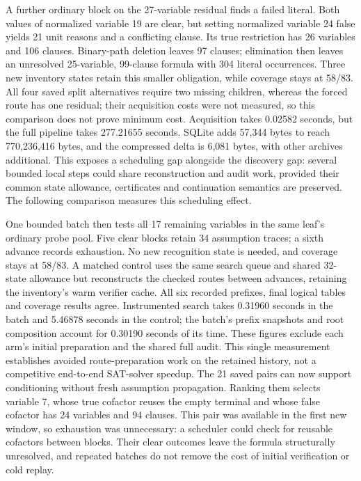 \documentclass[11pt,a4paper]{article}
\numberwithin{equation}{section}
\theoremstyle{plain}
\theoremstyle{definition}
\theoremstyle{remark}
\begin{document}
A further ordinary block on the 27-variable residual finds a failed literal. Both values of normalized variable 19 are clear, but setting normalized variable 24 false yields 21 unit reasons and a conflicting clause. Its true restriction has 26 variables and 106 clauses. Binary-path deletion leaves 97 clauses; elimination then leaves an unresolved 25-variable, 99-clause formula with 304 literal occurrences. Three new inventory states retain this smaller obligation, while coverage stays at 58/83. All four saved split alternatives require two missing children, whereas the forced route has one residual; their acquisition costs were not measured, so this comparison does not prove minimum cost. Acquisition takes 0.02582 seconds, but the full pipeline takes 277.21655 seconds. SQLite adds 57,344 bytes to reach 770,236,416 bytes, and the compressed delta is 6,081 bytes, with other archives additional. This exposes a scheduling gap alongside the discovery gap: several bounded local steps could share reconstruction and audit work, provided their common state allowance, certificates and continuation semantics are preserved. The following comparison measures this scheduling effect.

One bounded batch then tests all 17 remaining variables in the same leaf's ordinary probe pool. Five clear blocks retain 34 assumption traces; a sixth advance records exhaustion. No new recognition state is needed, and coverage stays at 58/83. A matched control uses the same search queue and shared 32-state allowance but reconstructs the checked routes between advances, retaining the inventory's warm verifier cache. All six recorded prefixes, final logical tables and coverage results agree. Instrumented search takes 0.31960 seconds in the batch and 5.46878 seconds in the control; the batch's prefix snapshots and root composition account for 0.30190 seconds of its time. These figures exclude each arm's initial preparation and the shared full audit. This single measurement establishes avoided route-preparation work on the retained history, not a competitive end-to-end SAT-solver speedup. The 21 saved pairs can now support conditioning without fresh assumption propagation. Ranking them selects variable 7, whose true cofactor reuses the empty terminal and whose false cofactor has 24 variables and 94 clauses. This pair was available in the first new window, so exhaustion was unnecessary: a scheduler could check for reusable cofactors between blocks. Their clear outcomes leave the formula structurally unresolved, and repeated batches do not remove the cost of initial verification or cold replay.
\end{document}
